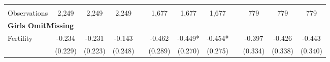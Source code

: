 \begin{landscape}
\begin{table}[htpb!]
\begin{center}
\begin{tabular}{lcccp{2mm}cccp{2mm}ccc}
\begin{footnotesize}\end{footnotesize}&\begin{footnotesize}\end{footnotesize}&\begin{footnotesize}\end{footnotesize}&\begin{footnotesize}\end{footnotesize}&\begin{footnotesize}\end{footnotesize}&\begin{footnotesize}\end{footnotesize}&\begin{footnotesize}\end{footnotesize}&\begin{footnotesize}\end{footnotesize}&\begin{footnotesize}\end{footnotesize}&\begin{footnotesize}\end{footnotesize}&\begin{footnotesize}\end{footnotesize}&\begin{footnotesize}\end{footnotesize}\\Observations&2,249&2,249&2,249&&1,677&1,677&1,677&&779&779&779\\
\multicolumn{12}{l}{\textbf{Girls OmitMissing}}\\ 
Fertility&-0.234&-0.231&-0.143&&-0.462&-0.449*&-0.454*&&-0.397&-0.426&-0.443\\
&(0.229)&(0.223)&(0.248)&&(0.289)&(0.270)&(0.275)&&(0.334)&(0.338)&(0.340)\\

\end{tabular}
\end{center}
\end{table}
\end{landscape}
